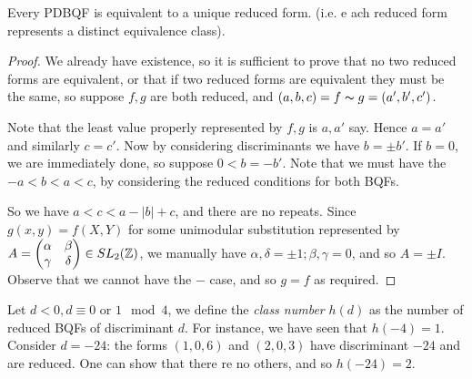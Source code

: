 \documentclass[10pt,a4paper]{article}
\begin{document}
\begin{theorem}
Every PDBQF is equivalent to a unique reduced form. (i.e. e ach reduced form represents a distinct equivalence class).
\end{theorem}
\begin{proof}
We already have existence, so it is sufficient to prove that no two reduced forms are equivalent, or that if two reduced forms are equivalent they must be the same, so suppose $f,g$ are both reduced, and $(a,b,c) = f \thicksim g = (a',b',c')$.

Note that the least value properly represented by $f, g$ is $a, a'$ say. Hence $a = a'$ and similarly $c = c'$. Now by considering discriminants we have $b = \pm b'$. If $b = 0$, we are immediately done, so suppose $0<b = -b'$. Note that we must have the $-a<b<a<c$, by considering the reduced conditions for both BQFs.

So we have $a<c<a - |b|+c$, and there are no repeats. Since $g(x,y) = f(X,Y)$ for some unimodular substitution represented by $A = \begin{pmatrix}
\alpha & \beta \\ \gamma & \delta
\end{pmatrix} \in SL_2(\mathbb{Z})$, we manually have $\alpha, \delta = \pm 1; \beta, \gamma = 0$, and so $A = \pm I$. Observe that we cannot have the $-$ case, and so $g = f$ as required.
\end{proof}

Let $d < 0, d \equiv 0$ or $1 \mod 4$, we define the \emph{class number} $h(d)$ as the number of reduced BQFs of discriminant $d$. For instance, we have seen that $h(-4) = 1$. Consider $d=-24$: the forms $(1,0,6)$ and $(2,0,3)$ have discriminant $-24$ and are reduced. One can show that there re no others, and so $h(-24) = 2$. 
\end{document}
